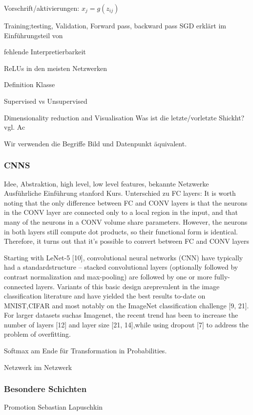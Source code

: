 \documentclass[11pt,a4paper]{article}
\numberwithin{equation}{section}
\begin{document}
	Vorschrift/aktivierungen: $x_j = g(z_{ij})$
	
	
	Training;testing, Validation, Forward pass, backward pass
	SGD erklärt im Einführungsteil von \cite{BatchNormalization}
	
	fehlende Interpretierbarkeit
	
	ReLUs in den meisten Netzwerken
	
	Definition Klasse
	
	Supervised vs Unsupervised
	
	Dimensionality reduction and Visualisation
	Was ist die letzte/vorletzte Shickht? vgl. Ac
	
	Wir verwenden die Begriffe Bild und Datenpunkt äquivalent.
	\subsubsection{CNNS}
	Idee, Abstraktion, high level, low level features, bekannte Netzwerke\\
	
	Ausführliche Einführung stanford Kurs\cite{cnn_stanford}. Unterschied zu FC layers: 
	It is worth noting that the only difference between FC and CONV layers is that the neurons in the CONV layer are connected only to a local region in the input, and that many of the neurons in a CONV volume share parameters. However, the neurons in both layers still compute dot products, so their functional form is identical. Therefore, it turns out that it’s possible to convert between FC and CONV layers
	
	Starting with LeNet-5   [10], convolutional neural networks (CNN) have typically had a standardstructure – stacked convolutional layers (optionally followed by contrast normalization and max-pooling)  are  followed  by  one  or  more  fully-connected  layers.   Variants  of  this  basic  design  areprevalent in the image classification literature and have yielded the best results to-date on MNIST,CIFAR and most notably on the ImageNet classification challenge [9, 21].  For larger datasets suchas Imagenet, the recent trend has been to increase the number of layers  [12] and layer size [21, 14],while using dropout [7] to address the problem of overfitting.\cite{goingdeeperwithconvolutions}
	
	Softmax am Ende für Transformation in Probabilities.
	
	Netzwerk im Netzwerk \cite{cnn_architectures_stanford, goingdeeperwithconvolutions}
	
	\subsubsection{Besondere Schichten}
	Promotion Sebastian Lapuschkin
	
\end{document}

